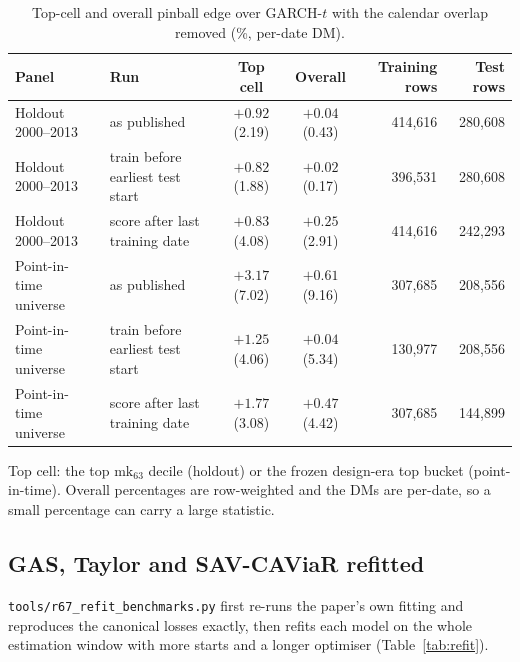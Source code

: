 \begin{table}[htbp]\centering\begin{threeparttable}
\caption{Top-cell and overall pinball edge over GARCH-$t$ with the calendar overlap removed (\%, per-date DM).}\label{tab:strict}\footnotesize
\begin{tabular}{llccrr}\toprule
Panel & Run & Top cell & Overall & Training rows & Test rows \\ \midrule
Holdout 2000--2013 & as published & $+0.92$ (2.19) & $+0.04$ (0.43) & 414,616 & 280,608 \\
Holdout 2000--2013 & train before earliest test start & $+0.82$ (1.88) & $+0.02$ (0.17) & 396,531 & 280,608 \\
Holdout 2000--2013 & score after last training date & $+0.83$ (4.08) & $+0.25$ (2.91) & 414,616 & 242,293 \\
\midrule
Point-in-time universe & as published & $+3.17$ (7.02) & $+0.61$ (9.16) & 307,685 & 208,556 \\
Point-in-time universe & train before earliest test start & $+1.25$ (4.06) & $+0.04$ (5.34) & 130,977 & 208,556 \\
Point-in-time universe & score after last training date & $+1.77$ (3.08) & $+0.47$ (4.42) & 307,685 & 144,899 \\
\bottomrule\end{tabular}
\begin{tablenotes}\footnotesize\item Top cell: the top $\mathrm{mk}_{63}$ decile (holdout) or the frozen design-era top bucket (point-in-time). Overall percentages are row-weighted and the DMs are per-date, so a small percentage can carry a large statistic.\end{tablenotes}
\end{threeparttable}\end{table}

\subsection*{GAS, Taylor and SAV-CAViaR refitted}
\texttt{tools/r67\_refit\_benchmarks.py} first re-runs the paper's own fitting and reproduces the canonical losses exactly, then refits each model on the whole estimation window with more starts and a longer optimiser (Table~\ref{tab:refit}).

